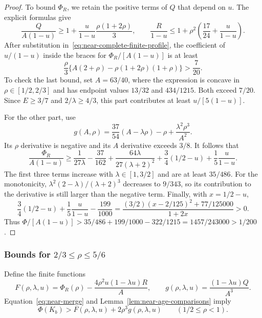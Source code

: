 \begin{proof}
To bound $\Phi_R$, we retain the positive terms of $Q$ that depend on $u$. The explicit formulas give
\[
 \frac Q{A(1-u)}\ge1+\frac u{1-u}\frac{\rho(1+2\rho)}3,
 \qquad \frac R{1-u}\le1+\rho^2\left(\frac{17}{24}+\frac u{1-u}\right).
\]
After substitution in~\eqref{eq:near-complete-finite-profile}, the coefficient of $u/(1-u)$ inside the braces for $\Phi_R/[A(1-u)]$ is at least
\[
 \frac\rho3\{A(2+\rho)-\rho(1+2\rho)(1+\rho)\}>\frac7{20}.
\]
To check the last bound, set $A=63/40$, where the expression is concave in $\rho\in[1/2,2/3]$ and has endpoint values $13/32$ and $434/1215$. Both exceed $7/20$. Since $E\ge3/7$ and $2/\lambda\ge4/3$, this part contributes at least $u/[5(1-u)]$.

For the other part, use
\[
 g(A,\rho)=\frac{37}{54}(A-\lambda\rho)-\rho+\frac{\lambda^2\rho^3}{A^2}.
\]
Its $\rho$ derivative is negative and its $A$ derivative exceeds $3/8$. It follows that
\[
 \frac{\Phi_R}{A(1-u)}\ge
 \frac1{27\lambda}-\frac{37}{162}+\frac{64\lambda}{27(\lambda+2)^2}
 +\frac34(1/2-u)+\frac15\frac u{1-u}.
\]
The first three terms increase with $\lambda\in[1,3/2]$ and are at least $35/486$. For the monotonicity, $\lambda^2(2-\lambda)/(\lambda+2)^3$ decreases to $9/343$, so its contribution to the derivative is still larger than the negative term. Finally, with $x=1/2-u$,
\[
 \frac34(1/2-u)+\frac15\frac u{1-u}-\frac{199}{1000}
 =\frac{(3/2)(x-2/125)^2+77/125000}{1+2x}>0.
\]
Thus $\Phi/[A(1-u)]>35/486+199/1000-322/1215
=1457/243000>1/200$.
\end{proof}

\subsubsection{Bounds for \texorpdfstring{$2/3\le\rho\le5/6$}{2/3 <= rho <= 5/6}}
Define the finite functions
\begin{equation}\label{eq:near-intermediate-functions}
 F(\rho,\lambda,u)=\Phi_R(\rho)-\frac{4\rho^2u(1-\lambda u)R}{A},
 \qquad g(\rho,\lambda,u)=\frac{(1-\lambda u)Q}{A^3}.
\end{equation}
Equation~\eqref{eq:near-merge} and Lemma~\ref{lem:near-age-comparisons} imply
\begin{equation}\label{eq:near-intermediate-lower}
 \Phi(K_b)>F(\rho,\lambda,u)+2\rho^3g(\rho,\lambda,u)
 \qquad(1/2\le\rho<1).
\end{equation}

